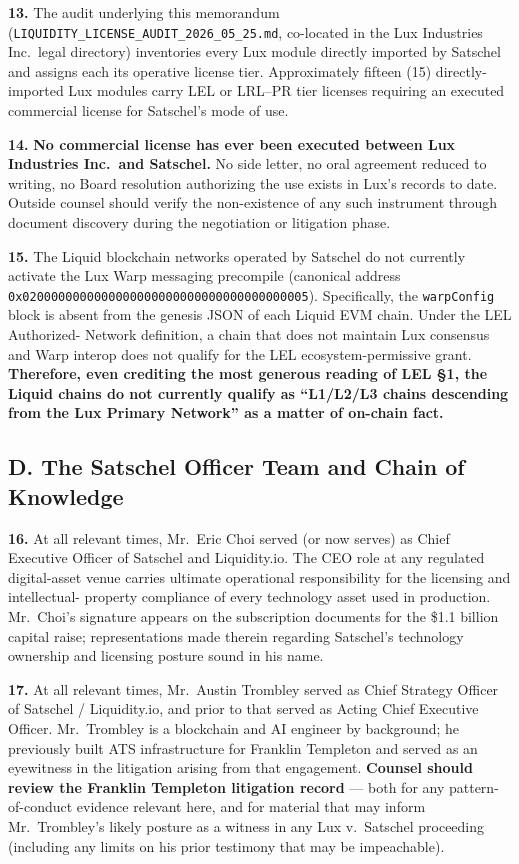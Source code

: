\documentclass[11pt,letterpaper]{article}
\begin{document}
\textbf{13.} The audit underlying this memorandum
(\texttt{LIQUIDITY\_LICENSE\_AUDIT\_2026\_05\_25.md}, co-located in
the Lux Industries Inc.\ legal directory) inventories every Lux module
directly imported by Satschel and assigns each its operative license
tier. Approximately fifteen (15) directly-imported Lux modules carry
LEL or LRL--PR tier licenses requiring an executed commercial license
for Satschel's mode of use.

\textbf{14.} \textbf{No commercial license has ever been executed
between Lux Industries Inc.\ and Satschel.} No side letter, no oral
agreement reduced to writing, no Board resolution authorizing the use
exists in Lux's records to date. Outside counsel should verify the
non-existence of any such instrument through document discovery during
the negotiation or litigation phase.

\textbf{15.} The Liquid blockchain networks operated by Satschel do
not currently activate the Lux Warp messaging precompile (canonical
address \texttt{0x0200000000000000000000000000000000000005}).
Specifically, the \texttt{warpConfig} block is absent from the
genesis JSON of each Liquid EVM chain. Under the LEL Authorized-
Network definition, a chain that does not maintain Lux consensus and
Warp interop does not qualify for the LEL ecosystem-permissive grant.
\textbf{Therefore, even crediting the most generous reading of LEL
\S 1, the Liquid chains do not currently qualify as ``L1/L2/L3 chains
descending from the Lux Primary Network'' as a matter of on-chain
fact.}

\subsection*{D. The Satschel Officer Team and Chain of Knowledge}

\textbf{16.} At all relevant times, Mr.\ Eric Choi served (or now
serves) as Chief Executive Officer of Satschel and Liquidity.io. The
CEO role at any regulated digital-asset venue carries ultimate
operational responsibility for the licensing and intellectual-
property compliance of every technology asset used in production.
Mr.\ Choi's signature appears on the subscription documents for the
\$1.1 billion capital raise; representations made therein regarding
Satschel's technology ownership and licensing posture sound
in his name.

\textbf{17.} At all relevant times, Mr.\ Austin Trombley served as
Chief Strategy Officer of Satschel / Liquidity.io, and prior to that
served as Acting Chief Executive Officer. Mr.\ Trombley is a
blockchain and AI engineer by background; he previously built ATS
infrastructure for Franklin Templeton and served as an eyewitness in
the litigation arising from that engagement. \textbf{Counsel should
review the Franklin Templeton litigation record} --- both for any
pattern-of-conduct evidence relevant here, and for material that may
inform Mr.\ Trombley's likely posture as a witness in any Lux v.\
Satschel proceeding (including any limits on his prior testimony
that may be impeachable).
\end{document}
